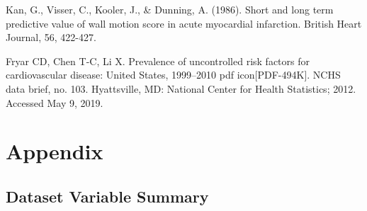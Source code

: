 \documentclass[
]{article}
\begin{document}
Kan, G., Visser, C., Kooler, J., \& Dunning, A. (1986). Short and long
term predictive value of wall motion score in acute myocardial
infarction. British Heart Journal, 56, 422-427.

Fryar CD, Chen T-C, Li X. Prevalence of uncontrolled risk factors for
cardiovascular disease: United States, 1999--2010 pdf
icon{[}PDF-494K{]}. NCHS data brief, no. 103. Hyattsville, MD: National
Center for Health Statistics; 2012. Accessed May 9, 2019.

\hypertarget{appendix}{%
\section{Appendix}\label{appendix}}

\hypertarget{dataset-variable-summary}{%
\subsection{Dataset Variable Summary}\label{dataset-variable-summary}}
\end{document}
